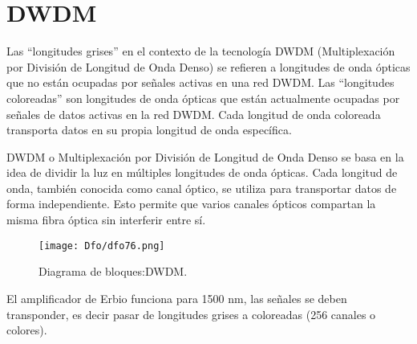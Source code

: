\documentclass[
	12pt, %
	fleqn, %
	a4paper, %
	oneside, %
]{LegrandOrangeBook}
\begin{document}
\chapter{DWDM}
\begin{remark}
Las ``longitudes grises'' en el contexto de la tecnología DWDM (Multiplexación por División de Longitud de Onda Denso) se refieren a longitudes de onda ópticas que no están ocupadas por señales activas en una red DWDM. Las ``longitudes coloreadas'' son longitudes de onda ópticas que están actualmente ocupadas por señales de datos activas en la red DWDM. Cada longitud de onda coloreada transporta datos en su propia longitud de onda específica.
\end{remark}
DWDM  o Multiplexación por División de Longitud de Onda Denso se basa en la idea de dividir la luz en múltiples longitudes de onda ópticas. Cada longitud de onda, también conocida como canal óptico, se utiliza para transportar datos de forma independiente. Esto permite que varios canales ópticos compartan la misma fibra óptica sin interferir entre sí.
\begin{figure}[H]
\centering
\texttt{[image: Dfo/dfo76.png]}
\caption{Diagrama de bloques:DWDM.}
\end{figure}
\begin{notation}
El amplificador de Erbio funciona para 1500 nm, las señales se deben transponder, es decir pasar de longitudes grises a coloreadas (256 canales o colores).
\end{notation}
\end{document}
